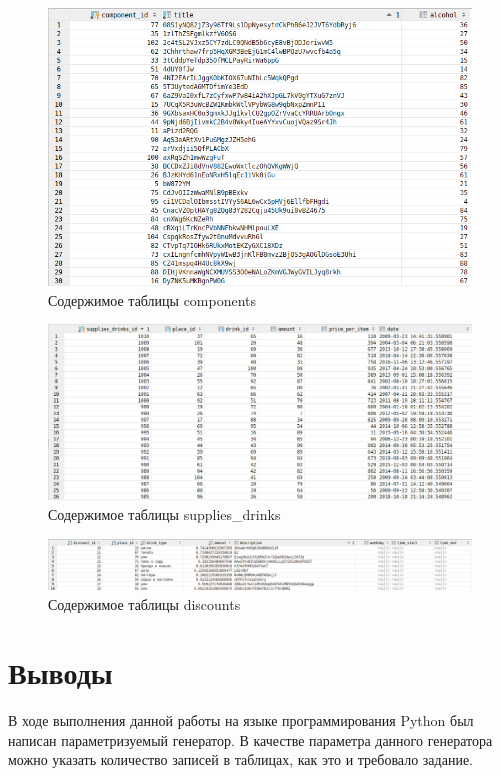 \begin{figure}[H]
	\begin{center}
		\includegraphics[scale=0.3]{./pics/components.png}
		\caption{Содержимое таблицы components} 
		\label{pic:components} %
	\end{center}
\end{figure}

\begin{figure}[H]
	\begin{center}
		\includegraphics[scale=0.5]{./pics/supplies_drinks.png}
		\caption{Содержимое таблицы supplies\_drinks} 
		\label{pic:supplies_drinks} %
	\end{center}
\end{figure}

\begin{figure}[H]
	\begin{center}
		\includegraphics[scale=0.5]{./pics/discounts.png}
		\caption{Содержимое таблицы discounts} 
		\label{pic:discounts} %
	\end{center}
\end{figure}

\section{Выводы}

В ходе выполнения данной работы на языке программирования Python был написан параметризуемый генератор.
В качестве параметра данного генератора можно указать количество записей в таблицах, как это и требовало задание.


